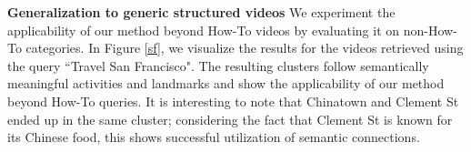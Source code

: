 \vspace{1mm}
\noindent\textbf{Generalization to generic structured videos}
We experiment the applicability of our method beyond How-To videos by evaluating it on non-How-To categories. In Figure \ref{sf}, we visualize the results for the videos retrieved using the query ``Travel San Francisco". The resulting clusters follow semantically meaningful activities and landmarks and show the applicability of our method beyond How-To queries. It is interesting to note that Chinatown and Clement St ended up in the same cluster; considering the fact that Clement St is known for its Chinese food, this shows successful utilization of semantic connections.
\vspace{-2mm}
